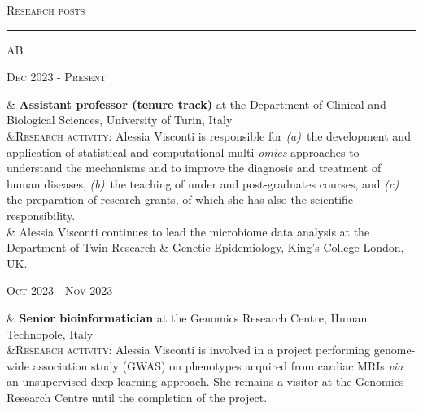 \documentclass[a4paper,10pt]{article}
\newcommand{\mediumtitle}[1]{
	\vspace{0.2cm}
	{\noindent
	\Large \textsc{#1}\\[-2ex]
	\hrule
	\vspace{0.2cm}}
}
\newenvironment{doubletablelist}
{
	\vspace{-0.2cm}
	\begin{longtable}[!h]{AB}}{\end{longtable}
}
\newcommand{\dtlist}[2]{
\hspace{-3cm}
\noindent
	\begin{minipage}{0.22\textwidth}
	\begin{flushright}
	\textsc{#1}
	\end{flushright}
	\end{minipage}
	& #2\\[0.2cm]
}
\begin{document}
\newpage


\mediumtitle{Research posts}

\begin{doubletablelist}
	\dtlist{Dec 2023 - Present}{\textbf{Assistant professor (tenure track)} at the Department of Clinical and Biological Sciences, University of Turin, Italy \\	
	 &\textsc{Research activity}: Alessia Visconti is responsible for \emph{(a)}~the development and application of statistical and computational multi\emph{-omics} approaches to understand the mechanisms and to improve the diagnosis and treatment of human diseases, \emph{(b)}~the teaching of under and post-graduates courses, and \emph{(c)} the preparation of research grants, of which she has also the scientific responsibility. \\
	 & Alessia Visconti continues to lead the microbiome data analysis at the Department of Twin Research \& Genetic Epidemiology, King's College London, UK.
	}
	
	\dtlist{Oct 2023 - Nov 2023}{\textbf{Senior bioinformatician} at the Genomics Research Centre, Human Technopole, Italy \\	
	 &\textsc{Research activity}: Alessia Visconti is involved in a project performing genome-wide association study (GWAS) on phenotypes acquired from cardiac MRIs \emph{via} an unsupervised deep-learning approach. She remains a visitor at the Genomics Research Centre until the completion of the project.
	}
    

\end{doubletablelist}
\end{document}
